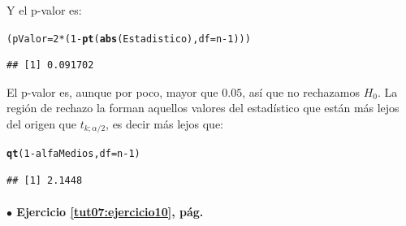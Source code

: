 \documentclass[10pt,a4paper]{article}\usepackage[]{graphicx}\usepackage[]{color}
\makeatletter
\newcommand{\hlnum}[1]{\textcolor[rgb]{0.686,0.059,0.569}{#1}}%
\newcommand{\hlopt}[1]{\textcolor[rgb]{0,0,0}{#1}}%
\newcommand{\hlstd}[1]{\textcolor[rgb]{0.345,0.345,0.345}{#1}}%
\newcommand{\hlkwb}[1]{\textcolor[rgb]{0.69,0.353,0.396}{#1}}%
\newcommand{\hlkwc}[1]{\textcolor[rgb]{0.333,0.667,0.333}{#1}}%
\newcommand{\hlkwd}[1]{\textcolor[rgb]{0.737,0.353,0.396}{\textbf{#1}}}%
\newenvironment{kframe}{%
 \def\at@end@of@kframe{}%
 \ifinner\ifhmode%
  \def\at@end@of@kframe{\end{minipage}}%
  \begin{minipage}{\columnwidth}%
 \fi\fi%
 \def\FrameCommand##1{\hskip\@totalleftmargin \hskip-\fboxsep
 \colorbox{shadecolor}{##1}\hskip-\fboxsep
     \hskip-\linewidth \hskip-\@totalleftmargin \hskip\columnwidth}%
 \MakeFramed {\advance\hsize-\width
   \@totalleftmargin\z@ \linewidth\hsize
   \@setminipage}}%
 {\par\unskip\endMakeFramed%
 \at@end@of@kframe}
\newenvironment{knitrout}{}{} %
\makeatother
\begin{document}
\begin{enumerate}
        Y el p-valor es:
\begin{knitrout}
\color{fgcolor}\begin{kframe}
\begin{alltt}
\hlstd{(pValor} \hlkwb{=} \hlnum{2} \hlopt{*} \hlstd{(}\hlnum{1} \hlopt{-} \hlkwd{pt}\hlstd{(}\hlkwd{abs}\hlstd{(Estadistico),} \hlkwc{df} \hlstd{= n} \hlopt{-} \hlnum{1}\hlstd{)))}
\end{alltt}
\begin{verbatim}
## [1] 0.091702
\end{verbatim}
\end{kframe}
\end{knitrout}
        El p-valor es, aunque por poco, mayor que $0.05$, así que no rechazamos $H_0$. La región de rechazo la forman aquellos valores del estadístico que están más lejos del origen que $t_{k; \alpha/2}$, es decir más lejos que:
\begin{knitrout}
\color{fgcolor}\begin{kframe}
\begin{alltt}
    \hlkwd{qt}\hlstd{(}\hlnum{1} \hlopt{-} \hlstd{alfaMedios,} \hlkwc{df}\hlstd{= n} \hlopt{-} \hlnum{1} \hlstd{)}
\end{alltt}
\begin{verbatim}
## [1] 2.1448
\end{verbatim}
\end{kframe}
\end{knitrout}


\end{enumerate}


\paragraph{\bf $\bullet$ Ejercicio \ref{tut07:ejercicio10}, pág. \pageref{tut07:ejercicio10}}
\label{tut07:ejercicio10:sol}\quad\\
\end{document}

